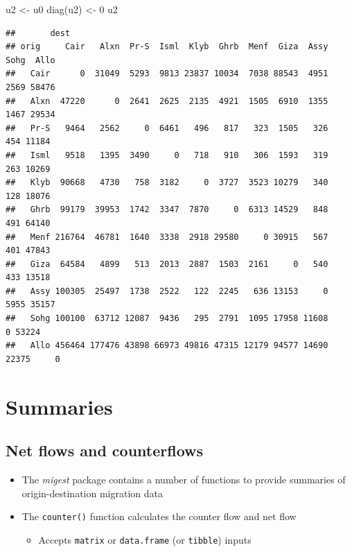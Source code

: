 \documentclass[
]{book}
\newenvironment{Shaded}{\begin{snugshade}}{\end{snugshade}}
\newcommand{\DecValTok}[1]{\textcolor[rgb]{0.00,0.00,0.81}{#1}}
\newcommand{\FunctionTok}[1]{\textcolor[rgb]{0.00,0.00,0.00}{#1}}
\newcommand{\NormalTok}[1]{#1}
\newcommand{\OtherTok}[1]{\textcolor[rgb]{0.56,0.35,0.01}{#1}}
\providecommand{\tightlist}{%
  \setlength{\itemsep}{0pt}\setlength{\parskip}{0pt}}
\begin{document}
\begin{Shaded}
\begin{Highlighting}[]
\NormalTok{u2 }\OtherTok{\textless{}{-}}\NormalTok{ u0}
\FunctionTok{diag}\NormalTok{(u2) }\OtherTok{\textless{}{-}} \DecValTok{0}
\NormalTok{u2}
\end{Highlighting}
\end{Shaded}

\begin{verbatim}
##       dest
## orig     Cair   Alxn  Pr-S  Isml  Klyb  Ghrb  Menf  Giza  Assy  Sohg  Allo
##   Cair      0  31049  5293  9813 23837 10034  7038 88543  4951  2569 58476
##   Alxn  47220      0  2641  2625  2135  4921  1505  6910  1355  1467 29534
##   Pr-S   9464   2562     0  6461   496   817   323  1505   326   454 11184
##   Isml   9518   1395  3490     0   718   910   306  1593   319   263 10269
##   Klyb  90668   4730   758  3182     0  3727  3523 10279   340   128 18076
##   Ghrb  99179  39953  1742  3347  7870     0  6313 14529   848   491 64140
##   Menf 216764  46781  1640  3338  2918 29580     0 30915   567   401 47843
##   Giza  64584   4899   513  2013  2887  1503  2161     0   540   433 13518
##   Assy 100305  25497  1738  2522   122  2245   636 13153     0  5955 35157
##   Sohg 100100  63712 12087  9436   295  2791  1095 17958 11608     0 53224
##   Allo 456464 177476 43898 66973 49816 47315 12179 94577 14690 22375     0
\end{verbatim}

\hypertarget{summaries}{%
\section{Summaries}\label{summaries}}

\hypertarget{net-flows-and-counterflows}{%
\subsection{Net flows and counterflows}\label{net-flows-and-counterflows}}

\begin{itemize}
\tightlist
\item
  The \emph{migest} package contains a number of functions to provide summaries of origin-destination migration data
\item
  The \texttt{counter()} function calculates the counter flow and net flow

  \begin{itemize}
  \tightlist
  \item
    Accepts \texttt{matrix} or \texttt{data.frame} (or \texttt{tibble}) inputs
  \end{itemize}
\end{itemize}
\end{document}
